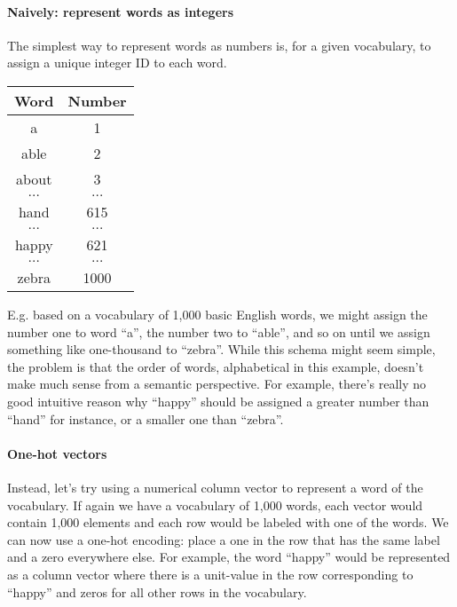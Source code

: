 \documentclass[12pt]{article}
\begin{document}
\paragraph{Naively: represent words as integers}
The simplest way to represent words as numbers is, for a given vocabulary, to assign a unique integer ID to each word.
\begin{table}[h]
  \begin{center}
    \begin{tabular}{c c}
      \hline
      Word & Number \\
      \hline
      a & 1 \\
      able & 2 \\
      about & 3 \\
      $\ldots$ & $\ldots$ \\
      hand & 615 \\
      $\ldots$ & $\ldots$ \\      
      happy & 621 \\
      $\ldots$ & $\ldots$ \\
      zebra & 1000 \\
      \hline
    \end{tabular}
  \end{center}
\end{table}
E.g. based on a vocabulary of 1,000 basic English words, we might assign the number one to word ``a'', the number two to ``able'', and so on until we assign something like one-thousand to ``zebra''. While this schema might seem simple, the problem is that the order of words, alphabetical in this example, doesn't make much sense from a semantic perspective. For example, there's really no good intuitive reason why ``happy'' should be assigned a greater number than ``hand'' for instance, or a smaller one than ``zebra''.

\paragraph{One-hot vectors}
\label{par: onehotvectors}
Instead, let's try using a numerical column vector to represent a word of the vocabulary. If again we have a vocabulary of 1,000 words, each vector would contain 1,000 elements and each row would be labeled with one of the words. We can now use a one-hot encoding: place a one in the row that has the same label and a zero everywhere else. For example, the word ``happy'' would be represented as a column vector where there is a unit-value in the row corresponding to ``happy'' and zeros for all other rows in the vocabulary.
\end{document}
